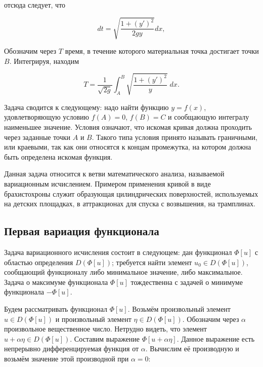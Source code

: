 \documentclass{article}
\begin{document}
\noindent отсюда следует, что

\begin{displaymath}
    dt = \sqrt{\frac{1 + (y')^2}{2gy}}dx,
\end{displaymath}

\noindent Обозначим через $T$ время, в течение которого материальная точка достигает точки $B$. Интегрируя, находим

\begin{displaymath}
    T = \frac{1}{\sqrt{2g}} \int_{A}^{B} \sqrt{\frac{1 + (y')^2}{y}} \; dx.
\end{displaymath}

\noindent Задача сводится к следующему: надо найти функцию $y = f(x)$, удовлетворяющую условию $f(A) = 0$, $f(B) = C$ и сообщающую интегралу наименьшее значение. Условия означают, что искомая кривая должна проходить через заданные точки $A$ и $B$. Такого типа условия принято называть граничными, или краевыми, так как они относятся к концам промежутка, на котором должна быть определена искомая функция.

\begin{info}
	Данная задача относится к ветви математического анализа, называемой вариационным исчислением. Примером применения кривой в виде брахистохроны служит образующая цилиндрических поверхностей, используемых на детских площадках, в аттракционах для спуска с возвышения, на трамплинах.
\end{info}


\subsection{Первая вариация функционала}

Задача вариационного исчисления состоит в следующем: дан функционал $\Phi[u]$ с областью определения $D(\Phi[u])$; требуется найти элемент $u_{0} \in D(\Phi[u])$, сообщающий функционалу либо минимальное значение, либо максимальное. Задача о максимуме функционала $\Phi[u]$ тождественна с задачей о минимуме функционала $- \Phi[u]$.

Будем рассматривать функционал $\Phi[u]$. Возьмём произвольный элемент $u \in D(\Phi[u])$ и произвольный элемент $\eta \in D(\Phi[u]) $. Обозначим через $\alpha$ произвольное вещественное число. Нетрудно видеть, что элемент $ u + \alpha \eta \in D(\Phi[u])$. Составим выражение $\Phi[u + \alpha \eta]$. Данное выражение есть непрерывно дифференцируемая функция от $\alpha$. Вычислим её производную и возьмём значение этой производной при $\alpha = 0$:
\end{document}
